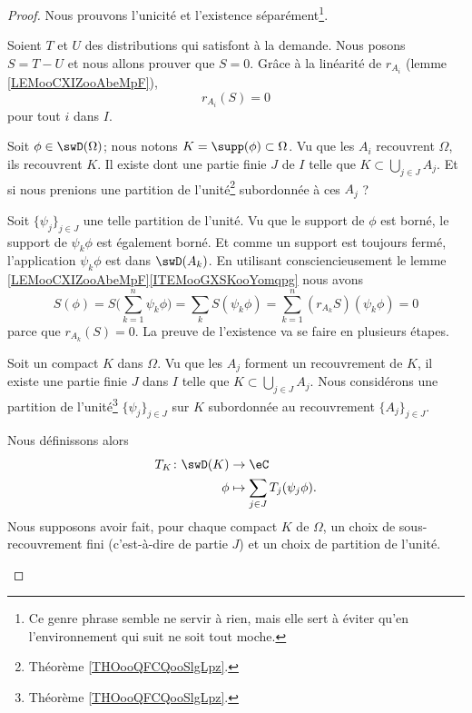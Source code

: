 \begin{proof}
	Nous prouvons l'unicité et l'existence séparément\footnote{Ce genre phrase semble ne servir à rien, mais elle sert à éviter qu'en l'environnement  qui suit ne soit tout moche.}.
	\begin{subproof}
		\spitem[Unicité]
		Soient \( T\) et \( U\) des distributions qui satisfont à la demande. Nous posons \( S=T-U\) et nous allons prouver que \( S=0\). Grâce à la linéarité de \( r_{A_i}\) (lemme \ref{LEMooCXIZooAbeMpF}),
		\begin{equation}
			r_{A_i}(S)=0
		\end{equation}
		pour tout \( i\) dans \( I\).

		Soit \( \phi\in \swD(\Omega)\); nous notons \( K=\supp(\phi)\subset\Omega\). Vu que les \( A_i\) recouvrent \( \Omega\), ils recouvrent \( K\). Il existe dont une partie finie \( J\) de \( I\) telle que \( K\subset\bigcup_{j\in J}A_j\). Et si nous prenions une partition de l'unité\footnote{Théorème \ref{THOooQFCQooSlgLpz}.} subordonnée à ces \( A_j\) ?

		Soit \( \{ \psi_j \}_{j\in J}\) une telle partition de l'unité. Vu que le support de \( \phi\) est borné, le support de \( \psi_k\phi\) est également borné. Et comme un support est toujours fermé, l'application \( \psi_k\phi\) est dans \( \swD(A_k)\). En utilisant consciencieusement le lemme \ref{LEMooCXIZooAbeMpF}\ref{ITEMooGXSKooYomqpg} nous avons
		\begin{equation}
			S(\phi)=S\big( \sum_{k=1}^n\psi_k\phi \big)=\sum_kS(\psi_k\phi)=\sum_{k=1}^n(r_{A_k}S)(\psi_k\phi)=0
		\end{equation}
		parce que \( r_{A_k}(S)=0\).
		La preuve de l'existence va se faire en plusieurs étapes.

		\spitem[Définition de \( T_K\)]
		Soit un compact \( K\) dans \( \Omega\). Vu que les \( A_j\) forment un recouvrement de \( K\), il existe une partie finie \( J\) dans \( I\) telle que \( K\subset\bigcup_{j\in J}A_j\). Nous considérons une partition de l'unité\footnote{Théorème \ref{THOooQFCQooSlgLpz}.} \( \{ \psi_j \}_{j\in J}\) sur \( K\) subordonnée au recouvrement \( \{ A_j \}_{j\in J}\).

		Nous définissons alors
		\begin{equation}
			\begin{aligned}
				T_K\colon \swD(K) & \to \eC                               \\
				\phi              & \mapsto \sum_{j\in J}T_j(\psi_j\phi).
			\end{aligned}
		\end{equation}
		Nous supposons avoir fait, pour chaque compact \( K\) de \( \Omega\), un choix de sous-recouvrement fini (c'est-à-dire de partie \( J\)) et un choix de partition de l'unité.


\end{subproof}
\end{proof}
